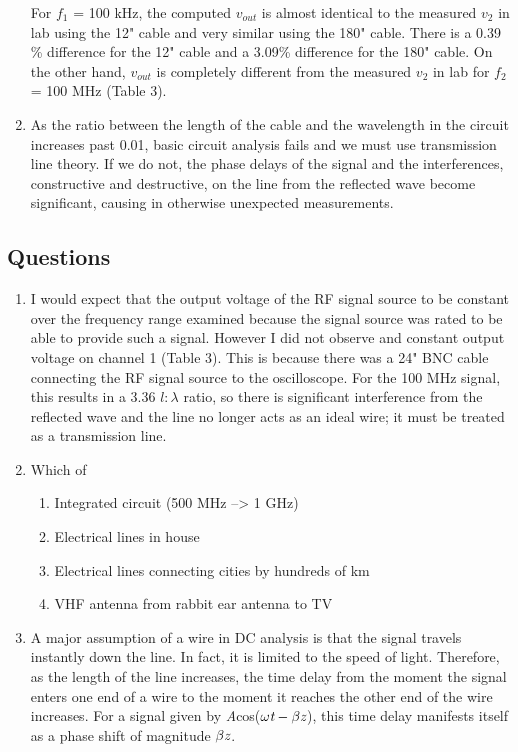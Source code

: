 \documentclass{article}
\begin{document}
\begin{enumerate}
	For $f_1$ = 100 kHz, the computed $v_{out}$ is almost identical to the measured $v_2$ in lab using the 12" cable and very similar using the 180" cable. There is a 0.39 \% difference for the 12" cable and a 3.09\% difference for the 180" cable. On the other hand, $v_{out}$ is completely different from the measured $v_2$ in lab for $f_2$ = 100 MHz (Table 3).
	
	\item As the ratio between the length of the cable and the wavelength in the circuit increases past 0.01, basic circuit analysis fails and we must use transmission line theory. If we do not, the phase delays of the signal and the interferences, constructive and destructive, on the line from the reflected wave become significant, causing in otherwise unexpected measurements.
\end{enumerate}

\subsection{Questions}
\begin{enumerate}
	\item I would expect that the output voltage of the RF signal source to be constant over the frequency range examined because the signal source was rated to be able to provide such a signal. However I did not observe and constant output voltage on channel 1 (Table 3). This is because there was a 24" BNC cable connecting the RF signal source to the oscilloscope. For the 100 MHz signal, this results in a 3.36 $l:\lambda$ ratio, so there is significant interference from the reflected wave and the line no longer acts as an ideal wire; it must be treated as a transmission line. 
	\item Which of 
	\begin{enumerate}
		\item Integrated circuit (500 MHz --> 1 GHz)
		\item Electrical lines in house
		\item Electrical lines connecting cities by hundreds of km
		\item VHF antenna from rabbit ear antenna to TV
	\end{enumerate}
	\item A major assumption of a wire in DC analysis is that the signal travels instantly down the line. In fact, it is limited to the speed of light. Therefore, as the length of the line increases, the time delay from the moment the signal enters one end of a wire to the moment it reaches the other end of the wire increases. For a signal given by \emph{A}cos($\omega\emph{t}-\beta\emph{z}$), this time delay manifests itself as a phase shift of magnitude $\beta\emph{z}$.
\end{enumerate}
\end{document}
